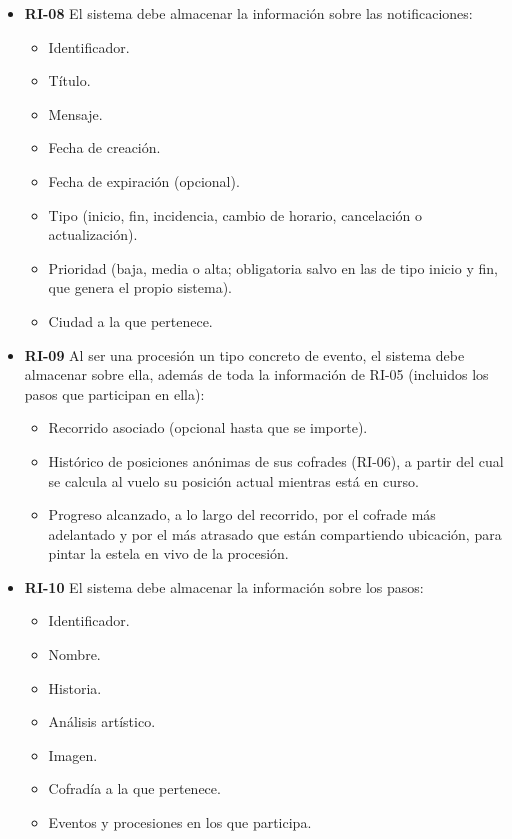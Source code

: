 \begin{itemize}
    \item \textbf{RI-08}  El sistema debe almacenar la información sobre las notificaciones:
    \begin{itemize}
        \item Identificador.
        \item Título.
        \item Mensaje.
        \item Fecha de creación.
        \item Fecha de expiración (opcional).
        \item Tipo (inicio, fin, incidencia, cambio de horario, cancelación o actualización).
        \item Prioridad (baja, media o alta; obligatoria salvo en las de tipo inicio y fin, que genera el propio sistema).
        \item Ciudad a la que pertenece.
    \end{itemize}

    \item \textbf{RI-09}  Al ser una procesión un tipo concreto de evento, el sistema debe almacenar sobre ella, además de toda la información de RI-05 (incluidos los pasos que participan en ella):
    \begin{itemize}
        \item Recorrido asociado (opcional hasta que se importe).
        \item Histórico de posiciones anónimas de sus cofrades (RI-06), a partir del cual se calcula al vuelo su posición actual mientras está en curso.
        \item Progreso alcanzado, a lo largo del recorrido, por el cofrade más adelantado y por el más atrasado que están compartiendo ubicación, para pintar la estela en vivo de la procesión.
    \end{itemize}

    \item \textbf{RI-10}  El sistema debe almacenar la información sobre los pasos:
    \begin{itemize}
        \item Identificador.
        \item Nombre.
        \item Historia.
        \item Análisis artístico.
        \item Imagen.
        \item Cofradía a la que pertenece.
        \item Eventos y procesiones en los que participa.
    \end{itemize}


\end{itemize}
